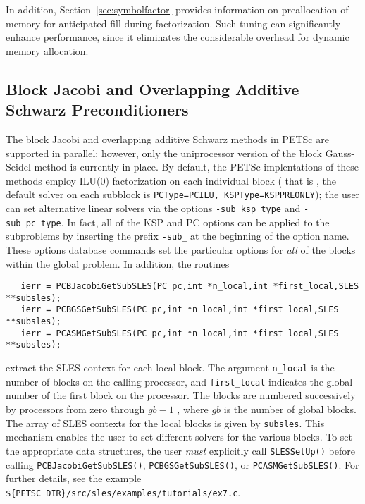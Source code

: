 In addition, Section~\ref{sec:symbolfactor} provides information on
preallocation of memory for anticipated fill during factorization.  
Such tuning can significantly enhance performance, since it
eliminates the considerable overhead for dynamic memory allocation.

\subsection{Block Jacobi and 
            Overlapping Additive Schwarz Preconditioners}
\label{sec:bjacobi}

 
  
The block Jacobi and overlapping additive Schwarz methods in PETSc are
supported in parallel; however, only the uniprocessor
version of the block Gauss-Seidel method is currently in place.
By default, the PETSc implentations of these methods
employ ILU(0) factorization on each individual block ( that is , the default solver on each 
subblock is {\tt PCType=PCILU,
KSPType=KSPPREONLY}); the user can set alternative linear solvers via the options 
 
{\tt -sub\_ksp\_type} and {\tt -sub\_pc\_type}. In fact, all of the KSP
and PC options can be applied to the subproblems by inserting the prefix
{\tt -sub\_} at the beginning of the option name. 
These options database commands set the particular options for {\em all} 
of the blocks within the global problem.  In addition, the routines
\begin{verbatim}
   ierr = PCBJacobiGetSubSLES(PC pc,int *n_local,int *first_local,SLES **subsles);
   ierr = PCBGSGetSubSLES(PC pc,int *n_local,int *first_local,SLES **subsles);
   ierr = PCASMGetSubSLES(PC pc,int *n_local,int *first_local,SLES **subsles);
\end{verbatim}
extract the  SLES context for each local 
block.  The argument {\tt n\_local} is the number of blocks on the 
calling processor, and {\tt first\_local} indicates the global number 
of the first block on the processor. The blocks are numbered 
successively by processors from zero through $ gb-1$ , 
where $ gb $ is the number of global blocks.  
The array of SLES contexts for the local blocks is given by {\tt subsles}. 
This mechanism enables the user to set different solvers for the 
various blocks.  To set the appropriate data structures, the 
user {\em must} explicitly call {\tt SLESSetUp()}  
before calling {\tt PCBJacobiGetSubSLES()}, {\tt PCBGSGetSubSLES()}, or
{\tt PCASMGetSubSLES()}.
For further details, see the 
example {\tt \$\{PETSC\_DIR\}/src/sles/examples/tutorials/ex7.c}.

